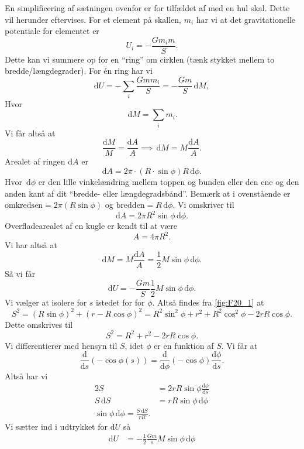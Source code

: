 \begin{sæt}
  En simplificering af sætningen ovenfor er for tilfældet af med en hul skal. Dette vil herunder eftervises.
  \tcblower
  For et element på skallen, $m_i$ har vi at det gravitationelle potentiale for elementet er
  \[ 
  U_i = - \frac{Gm_im}{S}
  .\]
  Dette kan vi summere op for en ``ring'' om cirklen (tænk stykket mellem to bredde/længdegrader). For én ring har vi
  \[ 
    \mathrm{d}U = - \sum_{i} \frac{Gmm_i}{S} = - \frac{Gm}{S} \, \mathrm{d}M 
  ,\]
  Hvor
  \[ 
  \, \mathrm{d}M = \sum_{i} m_i
  .\]
  Vi får altså at
  \[ 
    \frac{\mathrm{d}M}{M} = \frac{\mathrm{d}A}{A} \implies \, \mathrm{d}M = M \frac{\mathrm{d}A}{A}
  .\]
  Arealet af ringen $\mathrm{d}A$ er
  \[ 
  \mathrm{d}A = 2\pi\cdot (R\cdot \sin\phi)R \, \mathrm{d}\phi
  .\]
  Hvor $\, \mathrm{d}\phi$ er den lille vinkelændring mellem toppen og bunden eller den ene og den anden kant af dit ``bredde- eller længdegradsbånd''. Bemærk at i ovenstående er $\mathrm{omkredsen} = 2\pi(R \sin\phi)$ og $\mathrm{bredden} = R \, \mathrm{d}\phi$. Vi omskriver til
  \[ 
  \mathrm{d}A = 2\pi R^2 \sin\phi \, \mathrm{d}\phi
  .\]
  Overfladearealet af en kugle er kendt til at være
  \[ 
  A = 4\pi R^2
  .\]
  Vi har altså at
  \[ 
  \mathrm{d}M = M \frac{\mathrm{d}A}{A} = \frac{1}{2}M \sin\phi \, \mathrm{d}\phi
  .\]
  Så vi får
  \[ 
  \mathrm{d}U = - \frac{Gm}{S}\frac{1}{2}M \sin\phi \, \mathrm{d}\phi
  .\]
  Vi vælger at isolere for $s$ istedet for for $\phi$. Altså findes fra \autoref{fig:F20_1} at
  \[ 
  S^2 = (R \sin\phi)^2 + (r-R \cos\phi)^2 = R^2 \sin^2\phi + r^2 + R^2 \cos^2 \phi - 2rR \cos\phi
  .\]
  Dette omskrives til
  \[ 
  S^2 = R^2 + r^2 - 2rR \cos\phi
  .\]
  Vi differentierer med hensyn til $S$, idet $\phi$ er en funktion af $S$. Vi får at
  \[ 
  \frac{\mathrm{d}}{\mathrm{d}s}(-\cos\phi(s)) = \frac{\mathrm{d}}{\mathrm{d}\phi}(-\cos\phi) \frac{\mathrm{d}\phi}{\mathrm{d}s}   
  .\]
  Altså har vi
  \begin{align*}
    2S &= 2rR \sin\phi \frac{\mathrm{d}\phi}{\mathrm{d}s} \\
    S \, \mathrm{d}S &= rR \sin\phi \, \mathrm{d}\phi \\
    \sin \phi \, \mathrm{d}\phi = \frac{S \, \mathrm{d}S}{rR}
  .\end{align*}
  Vi sætter ind i udtrykket for $\mathrm{d}U$ så
  \begin{align*}
    \mathrm{d}U &= -\frac{1}{2}\frac{Gm}{s}M \sin\phi \, \mathrm{d}\phi \\

\end{align*}
\end{sæt}
